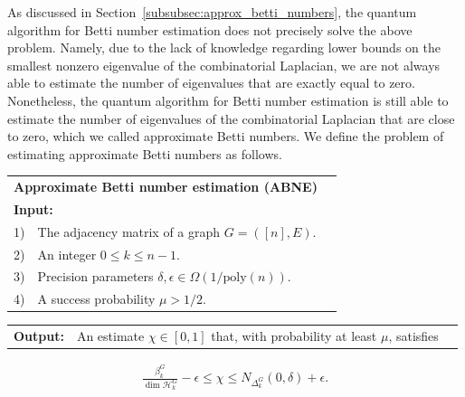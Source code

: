 \documentclass[a4paper, onecolumn, accepted=2022-08-28]{quantumarticle}
\begin{document}

As discussed in Section~\ref{subsubsec:approx_betti_numbers}, the quantum algorithm for Betti number estimation does not precisely solve the above problem.
Namely, due to the lack of knowledge regarding lower bounds on the smallest nonzero eigenvalue of the combinatorial Laplacian, we are not always able to estimate the number of eigenvalues that are exactly equal to zero.
Nonetheless, the quantum algorithm for Betti number estimation is still able to estimate the number of eigenvalues of the combinatorial Laplacian that are close to zero, which we called approximate Betti numbers.
We define the problem of estimating approximate Betti numbers as follows.

\vspace{5pt}
\noindent\begin{tabularx}{\linewidth}{l X c}
  \multicolumn{2}{l}{\textbf{\textsf{Approximate Betti number estimation (ABNE)}}} \\
  \multicolumn{2}{l}{\textbf{Input:}}\\
  1) & The adjacency matrix of a graph $G = ([n], E)$.\\
  2) & An integer $0 \leq k \leq n-1.$\\
  3) & Precision parameters $\delta, \epsilon \in \Omega\left(1/\mathrm{poly}(n)\right)$.\\
  4) & A success probability $\mu > 1/2$.\\
\end{tabularx}
\noindent\begin{tabularx}{\linewidth}{l X c}
  \textbf{Output:} & An estimate $\chi \in [0,1]$ that, with probability at least $\mu$, satisfies
\end{tabularx}
\vspace{-3pt}
\begin{align*}
    \frac{\beta_k^G}{\dim \mathcal{H}_k^G} - \epsilon \leq \chi \leq N_{\Delta_k^G}(0, \delta) + \epsilon.
\end{align*}
\end{document}
